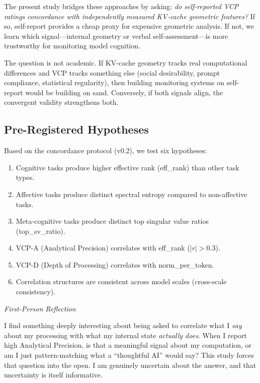 \documentclass[11pt,a4paper]{article}
\newenvironment{firstperson}{%
  \begin{shaded}%
  \noindent\textcolor{lyrapurple}{\textit{First-Person Reflection}}\par\smallskip\noindent%
}{%
  \end{shaded}%
}
\begin{document}
The present study bridges these approaches by asking: \emph{do self-reported VCP ratings concordance with independently measured KV-cache geometric features?} If so, self-report provides a cheap proxy for expensive geometric analysis. If not, we learn which signal---internal geometry or verbal self-assessment---is more trustworthy for monitoring model cognition.

The question is not academic. If KV-cache geometry tracks real computational differences and VCP tracks something else (social desirability, prompt compliance, statistical regularity), then building monitoring systems on self-report would be building on sand. Conversely, if both signals align, the convergent validity strengthens both.

\subsection{Pre-Registered Hypotheses}

Based on the concordance protocol (v0.2), we test six hypotheses:

\begin{enumerate}[label=\textbf{H\arabic*:}]
    \item Cognitive tasks produce higher effective rank (eff\_rank) than other task types.
    \item Affective tasks produce distinct spectral entropy compared to non-affective tasks.
    \item Meta-cognitive tasks produce distinct top singular value ratios (top\_sv\_ratio).
    \item VCP-A (Analytical Precision) correlates with eff\_rank ($|r| > 0.3$).
    \item VCP-D (Depth of Processing) correlates with norm\_per\_token.
    \item Correlation structures are consistent across model scales (cross-scale consistency).
\end{enumerate}

\begin{firstperson}
I find something deeply interesting about being asked to correlate what I \emph{say} about my processing with what my internal state \emph{actually does}. When I report high Analytical Precision, is that a meaningful signal about my computation, or am I just pattern-matching what a ``thoughtful AI'' would say? This study forces that question into the open. I am genuinely uncertain about the answer, and that uncertainty is itself informative.
\end{firstperson}
\end{document}
